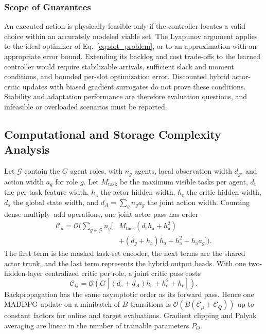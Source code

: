 \documentclass[journal]{IEEEtran}
\begin{document}
\subsubsection{Scope of Guarantees}
An executed action is physically feasible only if the controller locates a valid choice within an accurately modeled viable set. The Lyapunov argument applies to the ideal optimizer of Eq.~\eqref{eq:slot_problem}, or to an approximation with an appropriate error bound. Extending its backlog and cost trade-offs to the learned controller would require stabilizable arrivals, sufficient slack and moment conditions, and bounded per-slot optimization error. Discounted hybrid actor-critic updates with biased gradient surrogates do not prove these conditions. Stability and adaptation performance are therefore evaluation questions, and infeasible or overloaded scenarios must be reported.

\subsection{Computational and Storage Complexity Analysis}
Let $\mathcal G$ contain the $G$ agent roles, with $n_g$ agents, local
observation width $d_g$, and action width $a_g$ for role $g$.  Let
$M_{\mathrm{task}}$ be the maximum visible tasks per agent, $d_{\mathrm t}$
the per-task feature width, $h_{\mathrm a}$ the actor hidden width,
$h_{\mathrm c}$ the critic hidden width, $d_s$ the global state width, and
$d_A=\sum_g n_ga_g$ the joint action width.  Counting dense multiply--add
operations, one joint actor pass has order
\begin{equation}
\begin{aligned}
\mathcal C_{\mu}=\mathcal O\!\Bigg(
\sum_{g\in\mathcal G}n_g\Big[&
M_{\mathrm{task}}(d_{\mathrm t}h_{\mathrm a}+h_{\mathrm a}^2)\\[-0.3ex]
&+(d_g+h_{\mathrm a})h_{\mathrm a}
+h_{\mathrm a}^2+h_{\mathrm a}a_g\Big]\Bigg).
\end{aligned}
\label{eq:actor_complexity}
\end{equation}
The first term is the masked task-set encoder, the next terms are the shared
actor trunk, and the last term represents the hybrid output heads.  With one
two-hidden-layer centralized critic per role, a joint critic pass costs
\begin{equation}
\mathcal C_Q=\mathcal O\!\left(
G\left[(d_s+d_A)h_{\mathrm c}+h_{\mathrm c}^2+h_{\mathrm c}\right]
\right).
\label{eq:critic_complexity}
\end{equation}
Backpropagation has the same asymptotic order as its forward pass.  Hence one
MADDPG update on a minibatch of $B$ transitions is
$\mathcal O(B(\mathcal C_{\mu}+\mathcal C_Q))$ up to constant factors for
online and target evaluations.  Gradient clipping and Polyak averaging are
linear in the number of trainable parameters $P_{\Theta}$.
\end{document}
